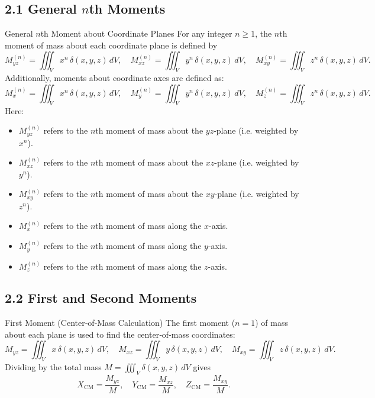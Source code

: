 \subsection*{2.1 General $n$th Moments}
\begin{define}{General $n$th Moment about Coordinate Planes}
  For any integer $n\ge1$, the $n$th moment of mass about each coordinate plane is defined by
  \[
    M^{(n)}_{yz}=\iiint_V x^n\,\delta(x,y,z)\,dV,
    \quad
    M^{(n)}_{xz}=\iiint_V y^n\,\delta(x,y,z)\,dV,
    \quad
    M^{(n)}_{xy}=\iiint_V z^n\,\delta(x,y,z)\,dV.
  \]
  Additionally, moments about coordinate axes are defined as:
  \[
    M^{(n)}_x = \iiint_V x^n\,\delta(x,y,z)\,dV,
    \quad
    M^{(n)}_y = \iiint_V y^n\,\delta(x,y,z)\,dV,
    \quad
    M^{(n)}_z = \iiint_V z^n\,\delta(x,y,z)\,dV.
  \]
  \noindent
  Here:
  \begin{itemize}
    \item $M^{(n)}_{yz}$ refers to the $n$th moment of mass about the $yz$-plane (i.e. weighted by $x^n$).
    \item $M^{(n)}_{xz}$ refers to the $n$th moment of mass about the $xz$-plane (i.e. weighted by $y^n$).
    \item $M^{(n)}_{xy}$ refers to the $n$th moment of mass about the $xy$-plane (i.e. weighted by $z^n$).
    \item $M^{(n)}_x$ refers to the $n$th moment of mass along the $x$-axis.
    \item $M^{(n)}_y$ refers to the $n$th moment of mass along the $y$-axis.
    \item $M^{(n)}_z$ refers to the $n$th moment of mass along the $z$-axis.
  \end{itemize}
\end{define}

\subsection*{2.2 First and Second Moments}

\begin{define}{First Moment (Center‑of‑Mass Calculation)}
  The first moment ($n=1$) of mass about each plane is used to find the center‑of‑mass coordinates:
  \[
    M_{yz}=\iiint_V x\,\delta(x,y,z)\,dV,
    \quad
    M_{xz}=\iiint_V y\,\delta(x,y,z)\,dV,
    \quad
    M_{xy}=\iiint_V z\,\delta(x,y,z)\,dV.
  \]
  Dividing by the total mass $M=\iiint_V\delta(x,y,z)\,dV$ gives
  \[
    X_{\mathrm{CM}}=\frac{M_{yz}}{M},
    \quad
    Y_{\mathrm{CM}}=\frac{M_{xz}}{M},
    \quad
    Z_{\mathrm{CM}}=\frac{M_{xy}}{M}.
  \]
\end{define}

